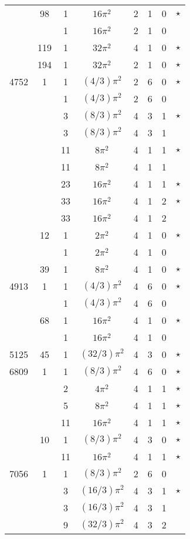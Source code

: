 \documentclass[12pt]{amsart}
\begin{document}
\begin{tabular}{ccc|ccccc}
 & 98 & 1 & $16\pi^2$ & 2 & 1 & 0 & $\star$ \\
 &  & 1 & $16\pi^2$ & 2 & 1 & 0 &  \\
 & 119 & 1 & $32\pi^2$ & 4 & 1 & 0 & $\star$ \\
 & 194 & 1 & $32\pi^2$ & 2 & 1 & 0 & $\star$ \\
4752 & 1 & 1 & $(4/3)\pi^2$ & 2 & 6 & 0 & $\star$ \\
 &  & 1 & $(4/3)\pi^2$ & 2 & 6 & 0 &  \\
 &  & 3 & $(8/3)\pi^2$ & 4 & 3 & 1 & $\star$ \\
 &  & 3 & $(8/3)\pi^2$ & 4 & 3 & 1 &  \\
 &  & 11 & $8\pi^2$ & 4 & 1 & 1 & $\star$ \\
 &  & 11 & $8\pi^2$ & 4 & 1 & 1 &  \\
 &  & 23 & $16\pi^2$ & 4 & 1 & 1 & $\star$ \\
 &  & 33 & $16\pi^2$ & 4 & 1 & 2 & $\star$ \\
 &  & 33 & $16\pi^2$ & 4 & 1 & 2 &  \\
 & 12 & 1 & $2\pi^2$ & 4 & 1 & 0 & $\star$ \\
 &  & 1 & $2\pi^2$ & 4 & 1 & 0 &  \\
 & 39 & 1 & $8\pi^2$ & 4 & 1 & 0 & $\star$ \\
4913 & 1 & 1 & $(4/3)\pi^2$ & 4 & 6 & 0 & $\star$ \\
 &  & 1 & $(4/3)\pi^2$ & 4 & 6 & 0 &  \\
 & 68 & 1 & $16\pi^2$ & 4 & 1 & 0 & $\star$ \\
 &  & 1 & $16\pi^2$ & 4 & 1 & 0 &  \\
5125 & 45 & 1 & $(32/3)\pi^2$ & 4 & 3 & 0 & $\star$ \\
6809 & 1 & 1 & $(8/3)\pi^2$ & 4 & 6 & 0 & $\star$ \\
 &  & 2 & $4\pi^2$ & 4 & 1 & 1 & $\star$ \\
 &  & 5 & $8\pi^2$ & 4 & 1 & 1 & $\star$ \\
 &  & 11 & $16\pi^2$ & 4 & 1 & 1 & $\star$ \\
 & 10 & 1 & $(8/3)\pi^2$ & 4 & 3 & 0 & $\star$ \\
 &  & 11 & $16\pi^2$ & 4 & 1 & 1 & $\star$ \\
7056 & 1 & 1 & $(8/3)\pi^2$ & 2 & 6 & 0 &  \\
 &  & 3 & $(16/3)\pi^2$ & 4 & 3 & 1 & $\star$ \\
 &  & 3 & $(16/3)\pi^2$ & 4 & 3 & 1 &  \\
 &  & 9 & $(32/3)\pi^2$ & 4 & 3 & 2 &  \\

\end{tabular}
\end{document}
